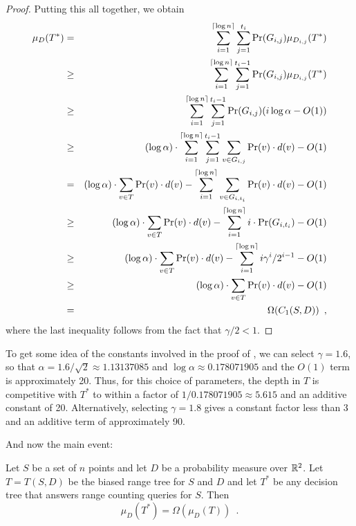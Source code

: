\documentclass[lotsofwhite,charterfonts]{patmorin}
\newcommand{\depth}{d}
\begin{document}
\begin{proof}
Putting this all together, we obtain
\begin{eqnarray*}
\mu_D(T^*) 
  & = & \sum_{i=1}^{\ceil{\log n}}\sum_{j=1}^{t_i}\Pr(G_{i,j})\mu_{D_{i,j}}(T^*) \\
  & \ge & \sum_{i=1}^{\ceil{\log n}}
    \sum_{j=1}^{t_i-1}\Pr(G_{i,j})\mu_{D_{i,j}}(T^*) \\
  & \ge & \sum_{i=1}^{\ceil{\log n}}\sum_{j=1}^{t_i-1}
           \Pr(G_{i,j})( i\log\alpha -O(1)) \\
  & \ge & (\log\alpha)\cdot
         \sum_{i=1}^{\ceil{\log n}}\sum_{j=1}^{t_i-1}
		\sum_{v\in G_{i,j}}\Pr(v)\cdot\depth(v) - O(1)\\
  & = & (\log\alpha)\cdot\sum_{v\in T}\Pr(v)\cdot \depth(v)
          -    \sum_{i=1}^{\ceil{\log n}}
		\sum_{v\in G_{i,t_i}}\Pr(v)\cdot\depth(v) - O(1)\\
  & \ge & (\log\alpha)\cdot\sum_{v\in T}\Pr(v)\cdot \depth(v)
          -    \sum_{i=1}^{\ceil{\log n}}i\cdot\Pr(G_{i,t_i}) - O(1) \\
  & \ge & (\log\alpha)\cdot\sum_{v\in T}\Pr(v)\cdot \depth(v)
          -    \sum_{i=1}^{\ceil{\log n}}i\gamma^i/2^{i-1} - O(1) \\
  & \ge &  (\log\alpha)\cdot\sum_{v\in T}\Pr(v)\cdot \depth(v) - O(1) \\
  & = & \Omega(C_1(S,D)) \enspace ,
\end{eqnarray*}
where the last inequality follows from the fact that $\gamma/2 < 1$. 
\end{proof}

To get some idea of the constants involved in the proof of
, we can select $\gamma=1.6$, so that
$\alpha=1.6/\sqrt{2}\approx 1.13137085$ and $\log \alpha \approx
0.178071905$ and the $O(1)$ term is approximately 20.  Thus, for this
choice of parameters, the depth in $T$ is competitive with $T^*$ to
within a factor of $1/0.178071905\approx 5.615$ and an additive
constant of 20.  Alternatively, selecting $\gamma=1.8$ gives a
constant factor less than 3 and an additive term of approximately 90.

And now the main event:

\begin{thm}
Let $S$ be a set of $n$ points and let $D$ be a probability measure
over $\mathbb{R}^2$.
Let $T=T(S,D)$ be the biased range tree for $S$ and $D$ and 
let $T^*$ be any decision
tree that answers range counting queries for $S$.  Then
\[
  \mu_D(T^*) = \Omega(\mu_D(T)) \enspace .
\]
\end{thm}
\end{document}
